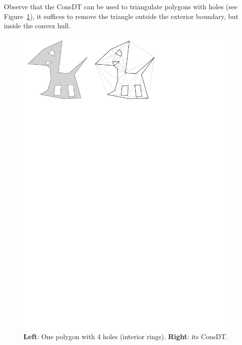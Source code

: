 %

Observe that the ConsDT can be used to triangulate polygons with holes (see Figure~\ref{fig:cdt_dog}), it suffices to remove the triangle outside the exterior boundary, but inside the convex hull.
\begin{figure}
  \centering
  \includegraphics[width=0.6\linewidth]{figs/cdt_dog}
  \caption{\textbf{Left}: One polygon with 4 holes (interior rings). \textbf{Right}: its ConsDT.}%
\label{fig:cdt_dog}
\end{figure}


%
